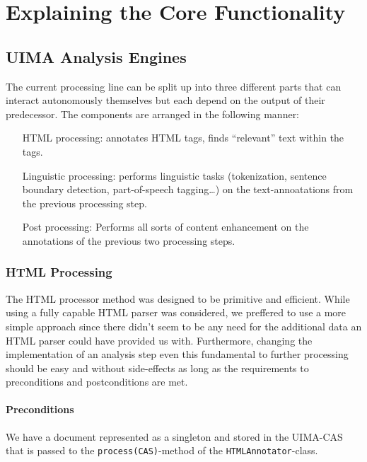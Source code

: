 \documentclass{article}
\begin{document}
\section{Explaining the Core Functionality}

\subsection{UIMA Analysis Engines}

The current processing line can be split up into three different parts that can
interact autonomously themselves but each depend on the output of their
predecessor. The components are arranged in the following manner:

\begin{itemize}

\item[HTML processing:] annotates HTML tags, finds ``relevant'' text within the
tags.

\item[Linguistic processing:] performs linguistic tasks (tokenization, sentence
boundary detection, part-of-speech tagging\ldots{}) on the text-annoatations
from the previous processing step.

\item[Post processing:] Performs all sorts of content enhancement on the
annotations of the previous two processing steps.

\end{itemize}

\subsubsection{HTML Processing}

The HTML processor method was designed to be primitive and efficient. While
using a fully capable HTML parser was considered, we preffered to use a more
simple approach since there didn't seem to be any need for the additional data
an HTML parser could have provided us with. Furthermore, changing the
implementation of an analysis step even this fundamental to further processing
should be easy and without side-effects as long as the requirements to
preconditions and postconditions are met.

\paragraph{Preconditions} We have a document represented as a singleton and
stored in the UIMA-CAS that is passed to the \verb#process(CAS)#-method of the
\verb#HTMLAnnotator#-class.
\end{document}
